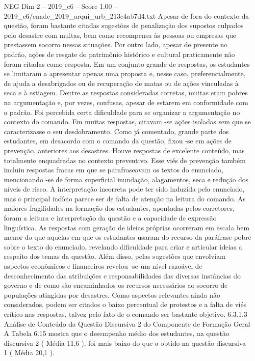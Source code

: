 \begin{textsample}{NEG Dim 2 – 2019\_c6 – Score 1.00 – 2019\_c6/enade\_2019\_arqui\_urb\_213c4ab7d4.txt}
Apesar de fora do contexto da questão, foram bastante citadas sugestões de penalização dos supostos culpados pelo desastre com multas, bem como recompensa às pessoas ou empresas que prestassem socorro nessas situações.
Por outro lado, apesar de presente no padrão, ações de resgate do patrimônio histórico e cultural praticamente não foram citadas como resposta.
Em um conjunto grande de respostas, os estudantes se limitaram a apresentar apenas uma proposta e, nesse caso, preferencialmente, de ajuda a desabrigados ou de recuperação de matas ou de ações vinculadas à seca e à estiagem.
Dentre as respostas consideradas corretas, muitas eram pobres na argumentação e, por vezes, confusas, apesar de estarem em conformidade com o padrão.
Foi percebida certa dificuldade para se organizar a argumentação no contexto do comando.
Em muitas respostas, citavam -se ações isoladas sem que se caracterizasse o seu desdobramento.
Como já comentado, grande parte dos estudantes, em desacordo com o comando da questão, fixou -se em ações de prevenção, anteriores aos desastres.
Houve respostas de excelente conteúdo, mas totalmente enquadradas no contexto preventivo.
Esse viés de prevenção também incluiu respostas fracas em que se parafraseavam os textos do enunciado, mencionando -se de forma superficial inundação, alagamentos, seca e redução dos níveis de risco.
A interpretação incorreta pode ter sido induzida pelo enunciado, mas o principal indício parece ser de falta de atenção na leitura do comando.
As maiores fragilidades na formação dos estudantes, apontadas pelos corretores, foram a leitura e interpretação da questão e a capacidade de expressão linguística.
As respostas com geração de ideias próprias ocorreram em escala bem menor do que aquelas em que os estudantes usaram do recurso da paráfrase pobre sobre o texto do enunciado, revelando dificuldade para criar e articular ideias a respeito dos temas da questão.
Além disso, pelas sugestões que envolviam aspectos econômicos e financeiros revelou -se um nível razoável de desconhecimento das atribuições e responsabilidades das diversas instâncias do governo e de como são encaminhados os recursos necessários ao socorro de populações atingidas por desastres.
Como aspectos relevantes ainda não considerados, podem ser citados o baixo percentual de protestos e a falta de viés crítico nas respostas, talvez pelo fato de o comando ser bastante objetivo. 6.3.1.3 Análise de Conteúdo da Questão Discursiva 2 do Componente de Formação Geral A Tabela 6.15 mostra que o desempenho médio dos estudantes, na questão discursiva 2 ( Média 11,6 ), foi mais baixo do que o obtido na questão discursiva 1 ( Média 20,1 ).

\end{textsample}
